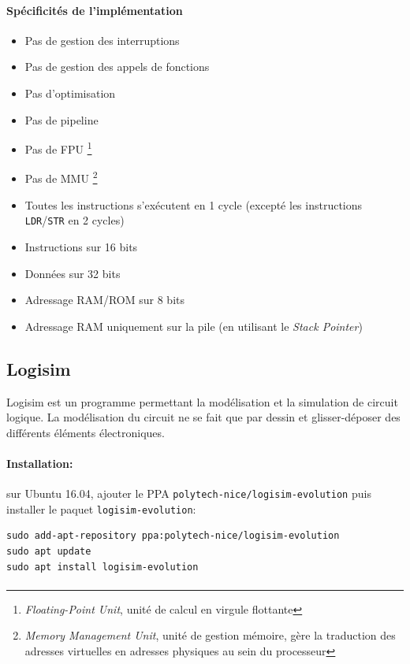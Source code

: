 \paragraph{Spécificités de l'implémentation}
\begin{itemize}
	\item Pas de gestion des interruptions
	\item Pas de gestion des appels de fonctions
	\item Pas d'optimisation
	\item Pas de pipeline
	\item Pas de FPU \footnote{\textit{Floating-Point Unit}, unité de calcul en virgule flottante}
	\item Pas de MMU \footnote{\textit{Memory Management Unit}, unité de gestion mémoire, gère la traduction des adresses virtuelles en adresses physiques au sein du processeur}
	\item Toutes les instructions s'exécutent en 1 cycle (excepté les instructions \texttt{LDR}/\texttt{STR} en 2 cycles)
	\item Instructions sur 16 bits
	\item Données sur 32 bits
	\item Adressage RAM/ROM sur 8 bits
	\item Adressage RAM uniquement sur la pile (en utilisant le \textit{Stack Pointer})
\end{itemize}

\subsection{Logisim}

Logisim est un programme permettant la modélisation et la simulation de circuit logique. La modélisation du circuit ne se fait que par dessin et glisser-déposer des différents éléments électroniques.

\paragraph{Installation:} sur Ubuntu 16.04, ajouter le PPA \texttt{polytech-nice/logisim-evolution} puis installer le paquet \texttt{logisim-evolution}:
\begin{lstlisting}
sudo add-apt-repository ppa:polytech-nice/logisim-evolution
sudo apt update
sudo apt install logisim-evolution
\end{lstlisting}

\paragraph{}


